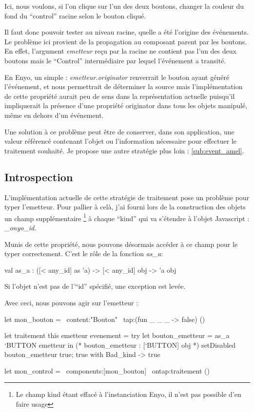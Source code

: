 Ici, nous voulons, si l'on clique sur l'un des deux boutons, changer la couleur du fond du
``control'' racine selon le bouton cliqué.

Il faut donc pouvoir tester au niveau racine, quelle a été l'origine des événements.
Le problème ici provient de la propagation au composant parent par les boutons.
En effet, l'argument \emph{emetteur} reçu par la racine ne contient pas l'un des deux boutons
mais le ``Control'' intermédiaire par lequel l'événement a transité.

En Enyo, un simple : \emph{emetteur.originator} renverrait le bouton ayant généré l'événement,
et nous permettrait de déterminer la source mais l'implémentation de cette propriété aurait 
peu de sens dans la représentation actuelle puisqu'il impliquerait la présence d'une propriété
originator dans tous les objets manipulé, même en dehors d'un événement.

Une solution à ce problème peut être de conserver, dans son application, une valeur référencé 
contenant l'objet ou l'information nécessaire pour effectuer le traitement souhaité.
Je propose une autre stratégie plus loin : \ref{sub:event_amel}.

\subsection{Introspection}

L'implémentation actuelle de cette stratégie de traitement pose un problème pour typer l'emetteur.
Pour pallier à celà, j'ai fourni lors de la construction des objets un champ supplémentaire
\footnote{Le champ kind étant effacé à l'instanciation Enyo, il n'est pas possible d'en faire usage} à chaque
``kind'' qui va s'étendre à l'objet Javascript : \emph{\_onyo\_id}.

Munis de cette propriété, nous pouvons désormais accéder à ce champ pour le typer correctement.
C'est le rôle de la fonction \emph{as\_a}:

\begin{OCaml}
  val as_a : ([< any_id] as 'a) -> [< any_id] obj -> 'a obj
\end{OCaml}

Si l'objet n'est pas de l'``id'' spécifié, une exception est levée.

Avec ceci, nous pouvons agir sur l'emetteur :
\begin{OCaml}
  let mon_bouton = ~content:"Bouton" ~tap:(fun _ _ _ -> false) ()

  let traitement this emetteur evenement =
     try 
         let bouton_emetteur = as_a `BUTTON emetteur in
         (* bouton_emetteur : [`BUTTON] obj *)
         setDisabled bouton_emetteur true;
         true
     with Bad_kind -> true

  let mon_control = ~components:[mon_bouton] ~ontap:traitement ()
\end{OCaml}

